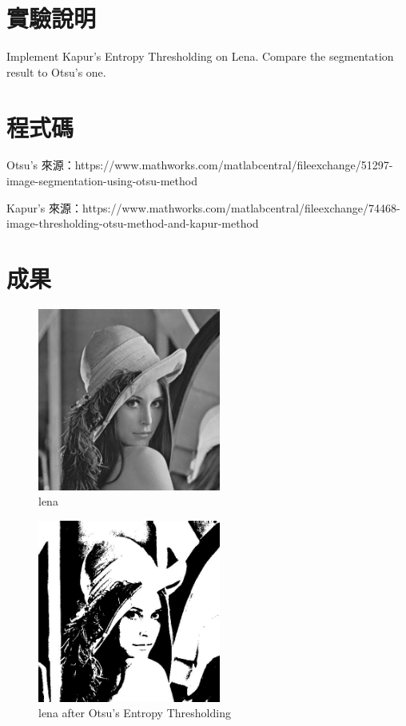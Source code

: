 \documentclass[conference]{IEEEtran}
\begin{document}


\section{實驗說明}
Implement Kapur’s Entropy Thresholding on Lena. Compare the
segmentation result to Otsu’s one. 

\section{程式碼}
Otsu's 來源：https://www.mathworks.com/matlabcentral/fileexchange/51297-image-segmentation-using-otsu-method

Kapur's 來源：https://www.mathworks.com/matlabcentral/fileexchange/74468-image-thresholding-otsu-method-and-kapur-method


\section{成果}

\begin{figure}[H]
\centerline{\includegraphics[width=6cm]{lena.jpg}}
\caption{lena}
\label{origin}
\end{figure}

\begin{figure}[H]
\centerline{\includegraphics[width=6cm]{otsu.jpg}}
\caption{lena after Otsu’s Entropy Thresholding}
\label{origin}
\end{figure}
\end{document}
